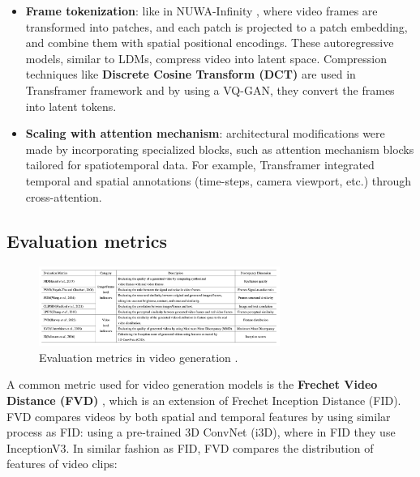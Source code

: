 \begin{itemize}
    \item \textbf{Frame tokenization}: like in NUWA-Infinity \cite{nuwa_infinity}, where video frames are transformed into patches, and each patch is projected to a patch embedding, and combine them with spatial positional encodings. These autoregressive models, similar to LDMs, compress video into latent space. Compression techniques like \textbf{Discrete Cosine Transform (DCT)} are used in Transframer \cite{transframer} framework and by using a VQ-GAN, they convert the frames into latent tokens.
    \item \textbf{Scaling with attention mechanism}: architectural modifications were made by incorporating specialized blocks, such as attention mechanism blocks tailored for spatiotemporal data. For example, Transframer \cite{transframer} integrated temporal and spatial annotations (time-steps, camera viewport, etc.) through cross-attention.
\end{itemize}















\subsection{Evaluation metrics}

\begin{figure}
    \centering
    \includegraphics[width=0.7\textwidth]{images/video_synthesis/eval_metrics.png}
    \caption{Evaluation metrics in video generation \cite{long_video_survey}.}
    \label{fig:video_synthesis_eval_metrics}
\end{figure}

A common metric used for video generation models is the \textbf{Frechet Video Distance (FVD)} \cite{fvd}, which is an extension of Frechet Inception Distance (FID). FVD compares videos by both spatial and temporal features by using similar process as FID: using a pre-trained 3D ConvNet (i3D), where in FID they use InceptionV3. In similar fashion as FID, FVD compares the distribution of features of video clips:

